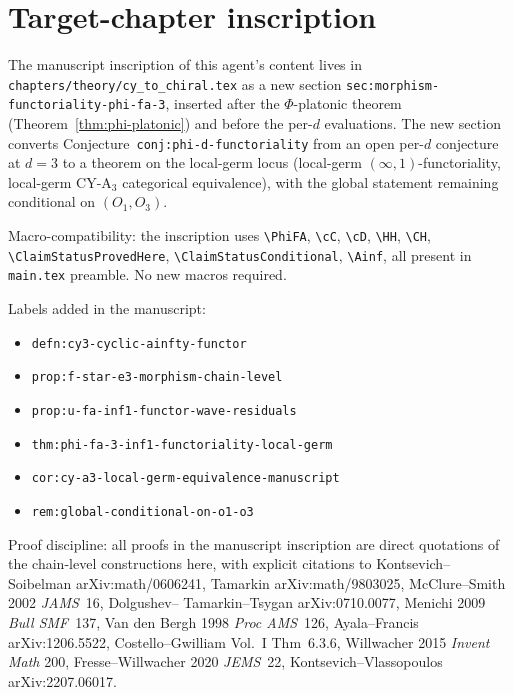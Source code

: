 \section*{Target-chapter inscription}

The manuscript inscription of this agent's content lives in
\texttt{chapters/theory/cy\_to\_chiral.tex} as a new section
\texttt{sec:morphism-functoriality-phi-fa-3}, inserted after the
$\Phi$-platonic theorem (Theorem~\ref{thm:phi-platonic}) and before
the per-$d$ evaluations.  The new section converts
Conjecture~\texttt{conj:phi-d-functoriality} from an open per-$d$
conjecture at $d = 3$ to a theorem on the local-germ locus
(local-germ $(\infty,1)$-functoriality, local-germ CY-A$_3$ categorical
equivalence), with the global statement remaining conditional on
$(O_1, O_3)$.

Macro-compatibility: the inscription uses \texttt{\textbackslash PhiFA},
\texttt{\textbackslash cC}, \texttt{\textbackslash cD},
\texttt{\textbackslash HH}, \texttt{\textbackslash CH},
\texttt{\textbackslash ClaimStatusProvedHere},
\texttt{\textbackslash ClaimStatusConditional},
\texttt{\textbackslash Ainf}, all present in \texttt{main.tex} preamble.
No new macros required.

Labels added in the manuscript:
\begin{itemize}
 \item \texttt{defn:cy3-cyclic-ainfty-functor}
 \item \texttt{prop:f-star-e3-morphism-chain-level}
 \item \texttt{prop:u-fa-inf1-functor-wave-residuals}
 \item \texttt{thm:phi-fa-3-inf1-functoriality-local-germ}
 \item \texttt{cor:cy-a3-local-germ-equivalence-manuscript}
 \item \texttt{rem:global-conditional-on-o1-o3}
\end{itemize}

Proof discipline: all proofs in the manuscript inscription are direct
quotations of the chain-level constructions here, with explicit
citations to Kontsevich--Soibelman arXiv:math/0606241, Tamarkin
arXiv:math/9803025, McClure--Smith 2002 \emph{JAMS}~16, Dolgushev--
Tamarkin--Tsygan arXiv:0710.0077, Menichi 2009 \emph{Bull SMF}~137,
Van den Bergh 1998 \emph{Proc AMS}~126, Ayala--Francis arXiv:1206.5522,
Costello--Gwilliam Vol.\ I Thm~6.3.6, Willwacher 2015 \emph{Invent Math}
200, Fresse--Willwacher 2020 \emph{JEMS}~22, Kontsevich--Vlassopoulos
arXiv:2207.06017.


